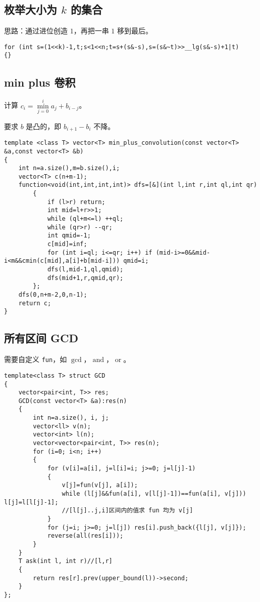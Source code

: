 \documentclass[12pt]{ctexart}
\begin{document}
\subsection{枚举大小为 $k$ 的集合}

思路：通过进位创造 $1$，再把一串 $1$ 移到最后。

\begin{lstlisting}
for (int s=(1<<k)-1,t;s<1<<n;t=s+(s&-s),s=(s&~t)>>__lg(s&-s)+1|t)
{}
\end{lstlisting}
\subsection{min plus 卷积}

计算 $c_i=\min\limits_{j=0}^i a_j+b_{i-j}$。

要求 $b$ 是凸的，即 $b_{i+1}-b_i$ 不降。

\begin{lstlisting}
template <class T> vector<T> min_plus_convolution(const vector<T> &a,const vector<T> &b)
{
	int n=a.size(),m=b.size(),i;
	vector<T> c(n+m-1);
	function<void(int,int,int,int)> dfs=[&](int l,int r,int ql,int qr)
		{
			if (l>r) return;
			int mid=l+r>>1;
			while (ql+m<=l) ++ql;
			while (qr>r) --qr;
			int qmid=-1;
			c[mid]=inf;
			for (int i=ql; i<=qr; i++) if (mid-i>=0&&mid-i<m&&cmin(c[mid],a[i]+b[mid-i])) qmid=i;
			dfs(l,mid-1,ql,qmid);
			dfs(mid+1,r,qmid,qr);
		};
	dfs(0,n+m-2,0,n-1);
	return c;
}

\end{lstlisting}

\subsection{所有区间 GCD}

需要自定义 \verb|fun|，如 $\gcd$，$\operatorname{and}$，$\operatorname{or}$。

\begin{lstlisting}
template<class T> struct GCD
{
	vector<pair<int, T>> res;
	GCD(const vector<T> &a):res(n)
	{
		int n=a.size(), i, j;
		vector<ll> v(n);
		vector<int> l(n);
		vector<vector<pair<int, T>> res(n);
		for (i=0; i<n; i++)
		{
			for (v[i]=a[i], j=l[i]=i; j>=0; j=l[j]-1)
			{
				v[j]=fun(v[j], a[i]);
				while (l[j]&&fun(a[i], v[l[j]-1])==fun(a[i], v[j])) l[j]=l[l[j]-1];
				//[l[j]..j,i]区间内的值求 fun 均为 v[j]
			}
			for (j=i; j>=0; j=l[j]) res[i].push_back({l[j], v[j]});
			reverse(all(res[i]));
		}
	}
	T ask(int l, int r)//[l,r]
	{
		return res[r].prev(upper_bound(l))->second;
	}
};
\end{lstlisting}
\end{document}
